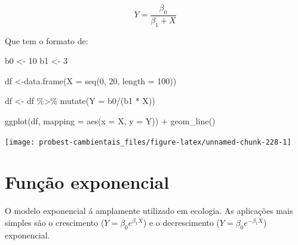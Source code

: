 \documentclass[
]{book}
\newenvironment{Shaded}{\begin{snugshade}}{\end{snugshade}}
\newcommand{\AttributeTok}[1]{\textcolor[rgb]{0.77,0.63,0.00}{#1}}
\newcommand{\DecValTok}[1]{\textcolor[rgb]{0.00,0.00,0.81}{#1}}
\newcommand{\FunctionTok}[1]{\textcolor[rgb]{0.00,0.00,0.00}{#1}}
\newcommand{\NormalTok}[1]{#1}
\newcommand{\OtherTok}[1]{\textcolor[rgb]{0.56,0.35,0.01}{#1}}
\newcommand{\SpecialCharTok}[1]{\textcolor[rgb]{0.00,0.00,0.00}{#1}}
\begin{document}
\[ Y = \frac{\beta_0}{\beta_1 + X}\]

Que tem o formato de:

\begin{Shaded}
\begin{Highlighting}[]
\NormalTok{b0 }\OtherTok{\textless{}{-}} \DecValTok{10}
\NormalTok{b1 }\OtherTok{\textless{}{-}} \DecValTok{3}

\NormalTok{df }\OtherTok{\textless{}{-}}\FunctionTok{data.frame}\NormalTok{(}\AttributeTok{X =} \FunctionTok{seq}\NormalTok{(}\DecValTok{0}\NormalTok{, }\DecValTok{20}\NormalTok{, }\AttributeTok{length =} \DecValTok{100}\NormalTok{))}

\NormalTok{df }\OtherTok{\textless{}{-}}\NormalTok{ df }\SpecialCharTok{\%\textgreater{}\%} \FunctionTok{mutate}\NormalTok{(}\AttributeTok{Y =}\NormalTok{ b0}\SpecialCharTok{/}\NormalTok{(b1 }\SpecialCharTok{*}\NormalTok{ X))}

\FunctionTok{ggplot}\NormalTok{(df, }\AttributeTok{mapping =} \FunctionTok{aes}\NormalTok{(}\AttributeTok{x =}\NormalTok{ X, }\AttributeTok{y =}\NormalTok{ Y)) }\SpecialCharTok{+}
  \FunctionTok{geom\_line}\NormalTok{()}
\end{Highlighting}
\end{Shaded}

\begin{center}\texttt{[image: probest-cambientais\_files/figure-latex/unnamed-chunk-228-1]} \end{center}

\hypertarget{funuxe7uxe3o-exponencial}{%
\section{Função exponencial}\label{funuxe7uxe3o-exponencial}}

O modelo exponencial á amplamente utilizado em ecologia. As aplicações mais simples são o crescimento (\(Y = \beta_0 e^{\beta_1 X}\)) e o decrescimento (\(Y = \beta_0 e^{-\beta_1 X}\)) exponencial.
\end{document}
